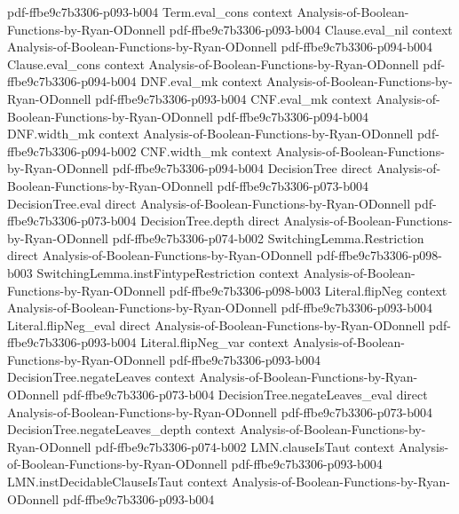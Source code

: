 \begin{theorem}
  {pdf-ffbe9c7b3306-p093-b004}
\proofstep
  {Term.eval_cons}
  {context}
  {Analysis-of-Boolean-Functions-by-Ryan-ODonnell}
  {pdf-ffbe9c7b3306-p093-b004}
\proofstep
  {Clause.eval_nil}
  {context}
  {Analysis-of-Boolean-Functions-by-Ryan-ODonnell}
  {pdf-ffbe9c7b3306-p094-b004}
\proofstep
  {Clause.eval_cons}
  {context}
  {Analysis-of-Boolean-Functions-by-Ryan-ODonnell}
  {pdf-ffbe9c7b3306-p094-b004}
\proofstep
  {DNF.eval_mk}
  {context}
  {Analysis-of-Boolean-Functions-by-Ryan-ODonnell}
  {pdf-ffbe9c7b3306-p093-b004}
\proofstep
  {CNF.eval_mk}
  {context}
  {Analysis-of-Boolean-Functions-by-Ryan-ODonnell}
  {pdf-ffbe9c7b3306-p094-b004}
\proofstep
  {DNF.width_mk}
  {context}
  {Analysis-of-Boolean-Functions-by-Ryan-ODonnell}
  {pdf-ffbe9c7b3306-p094-b002}
\proofstep
  {CNF.width_mk}
  {context}
  {Analysis-of-Boolean-Functions-by-Ryan-ODonnell}
  {pdf-ffbe9c7b3306-p094-b004}
\proofstep
  {DecisionTree}
  {direct}
  {Analysis-of-Boolean-Functions-by-Ryan-ODonnell}
  {pdf-ffbe9c7b3306-p073-b004}
\proofstep
  {DecisionTree.eval}
  {direct}
  {Analysis-of-Boolean-Functions-by-Ryan-ODonnell}
  {pdf-ffbe9c7b3306-p073-b004}
\proofstep
  {DecisionTree.depth}
  {direct}
  {Analysis-of-Boolean-Functions-by-Ryan-ODonnell}
  {pdf-ffbe9c7b3306-p074-b002}
\proofstep
  {SwitchingLemma.Restriction}
  {direct}
  {Analysis-of-Boolean-Functions-by-Ryan-ODonnell}
  {pdf-ffbe9c7b3306-p098-b003}
\proofstep
  {SwitchingLemma.instFintypeRestriction}
  {context}
  {Analysis-of-Boolean-Functions-by-Ryan-ODonnell}
  {pdf-ffbe9c7b3306-p098-b003}
\proofstep
  {Literal.flipNeg}
  {context}
  {Analysis-of-Boolean-Functions-by-Ryan-ODonnell}
  {pdf-ffbe9c7b3306-p093-b004}
\proofstep
  {Literal.flipNeg_eval}
  {direct}
  {Analysis-of-Boolean-Functions-by-Ryan-ODonnell}
  {pdf-ffbe9c7b3306-p093-b004}
\proofstep
  {Literal.flipNeg_var}
  {context}
  {Analysis-of-Boolean-Functions-by-Ryan-ODonnell}
  {pdf-ffbe9c7b3306-p093-b004}
\proofstep
  {DecisionTree.negateLeaves}
  {context}
  {Analysis-of-Boolean-Functions-by-Ryan-ODonnell}
  {pdf-ffbe9c7b3306-p073-b004}
\proofstep
  {DecisionTree.negateLeaves_eval}
  {direct}
  {Analysis-of-Boolean-Functions-by-Ryan-ODonnell}
  {pdf-ffbe9c7b3306-p073-b004}
\proofstep
  {DecisionTree.negateLeaves_depth}
  {context}
  {Analysis-of-Boolean-Functions-by-Ryan-ODonnell}
  {pdf-ffbe9c7b3306-p074-b002}
\proofstep
  {LMN.clauseIsTaut}
  {context}
  {Analysis-of-Boolean-Functions-by-Ryan-ODonnell}
  {pdf-ffbe9c7b3306-p093-b004}
\proofstep
  {LMN.instDecidableClauseIsTaut}
  {context}
  {Analysis-of-Boolean-Functions-by-Ryan-ODonnell}
  {pdf-ffbe9c7b3306-p093-b004}

\end{theorem}

